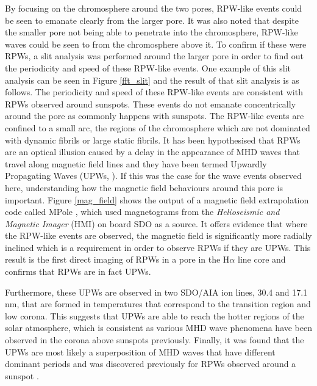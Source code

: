     By focusing on the chromosphere around the two pores, RPW-like events could be seen to emanate clearly from the larger pore.
    It was also noted that despite the smaller pore not being able to penetrate into the chromosphere, RPW-like waves could be seen to from the chromosphere above it. 
    To confirm if these were RPWs, a slit analysis was performed around the larger pore in order to find out the periodicity and speed of these RPW-like events.
    One example of this slit analysis can be seen in Figure \ref{fft_slit} and the result of that slit analysis is as follows.
    The periodicity and speed of these RPW-like events are consistent with RPWs observed around sunspots.
    These events do not emanate concentrically around the pore as commonly happens with sunspots.
    The RPW-like events are confined to a small arc, the regions of the chromosphere which are not dominated with dynamic fibrils or large static fibrils.
    It has been hypothesised that RPWs are an optical illusion caused by a delay in the appearance of MHD waves that travel along magnetic field lines and they have been termed Upwardly Propagating Waves (UPWs, \citealt{Bloomfiel2008}).
    If this was the case for the wave events observed here, understanding how the magnetic field behaviours around this pore is important. 
	Figure \ref{mag_field} shows the output of a magnetic field extrapolation code called MPole \citep{Longcope1996,Longcope2002}, which used magnetograms from the \textit{Helioseismic and Magnetic Imager} (HMI) on board SDO as a source.
	It offers evidence that where the RPW-like events are observed, the magnetic field is significantly more radially inclined which is a requirement in order to observe RPWs if they are UPWs. 
	This result is the first direct imaging of RPWs in a pore in the H$\alpha$ line core and confirms that RPWs are in fact UPWs.
	 
	Furthermore, these UPWs are observed in two SDO/AIA ion lines, 30.4 and 17.1 nm, that are formed in temperatures that correspond to the transition region and low corona.
	This suggests that UPWs are able to reach the hotter regions of the solar atmosphere, which is consistent as various MHD wave phenomena have been observed in the corona above sunspots previously. 
	Finally, it was found that the UPWs are most likely a superposition of MHD waves that have different dominant periods and was discovered previously for RPWs observed around a sunspot \citep{Jess2013}. 
	
